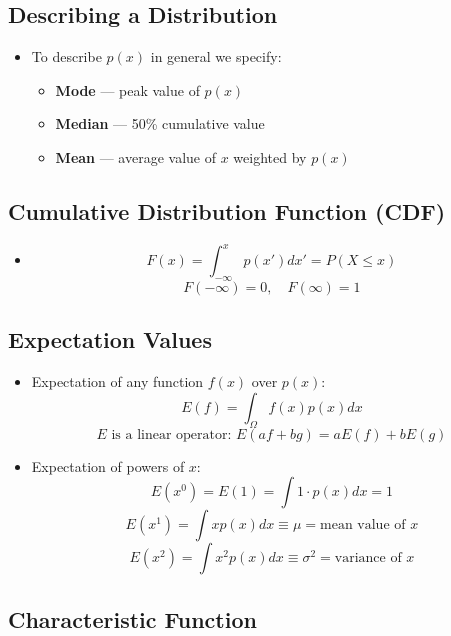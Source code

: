 \subsection{Describing a Distribution}

\begin{itemize}
      \item To describe $p(x)$ in general we specify:
            \begin{itemize}
                  \item \textbf{Mode} — peak value of $p(x)$
                  \item \textbf{Median} — 50\% cumulative value
                  \item \textbf{Mean} — average value of $x$ weighted by $p(x)$
            \end{itemize}
\end{itemize}

\subsection{Cumulative Distribution Function (CDF)}

\begin{itemize}
      \item
            \[ F(x) = \int_{-\infty}^{x} p(x') dx' = P(X \leq x) \]
            \[ F(-\infty) = 0, \quad F(\infty) = 1 \]
\end{itemize}

\subsection{Expectation Values}

\begin{itemize}
      \item Expectation of any function $f(x)$ over $p(x)$:
            \[ E(f) = \int_{\Omega} f(x) p(x) dx \]
            \[ E \text{ is a linear operator: } E(af + bg) = aE(f) + bE(g) \]

      \item Expectation of powers of $x$:
            \[ E(x^0) = E(1) = \int 1 \cdot p(x) dx = 1 \]
            \[ E(x^1) = \int x p(x) dx \equiv \mu = \text{mean value of } x \]
            \[ E(x^2) = \int x^2 p(x) dx \equiv \sigma^2 = \text{variance of } x \]
\end{itemize}

\subsection{Characteristic Function}

